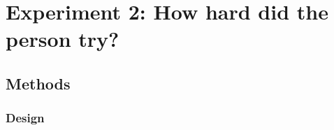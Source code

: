 \documentclass[11pt]{article}
\begin{document}
\section{Experiment 2: How hard did the person try?}
\label{sec:experiment_2_effort}

\subsection{Methods}
\label{sub:methods}

\subsubsection{Design}
\label{ssub:design}

\begin{figure}[H]
\setcounter{subfigure}{0} %
\renewcommand{\thesubfigure}{\arabic{subfigure}}
\centering
{\hfill}
\hfill
{}
\hfill
{}
\hfill
{}
{\hfill}
{\hfill}

\end{figure}
\end{document}
